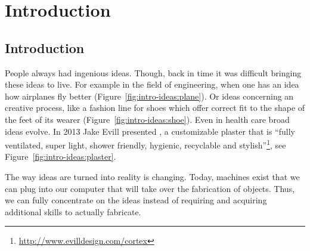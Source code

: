 \documentclass[../ClassicThesis.tex]{subfiles}
\begin{document}
\chapter{Introduction}
\label{ch:introduction}

\section{Introduction}



People always had ingenious ideas. Though, back in time it was
difficult bringing these ideas to live. For example in the field of
engineering, when one has an idea how airplanes fly better
(Figure~\ref{fig:intro-ideas:plane}). Or ideas concerning an creative
process, like a fashion line for shoes which offer correct fit to the
shape of the feet of its wearer (Figure~\ref{fig:intro-ideas:shoe}).
Even in health care broad ideas evolve. In 2013 Jake Evill presented
, a customizable plaster that is \enquote{fully
  ventilated, super light, shower friendly, hygienic, recyclable and
  stylish}\footnote{\url{http://www.evilldesign.com/cortex}}, see
Figure~\ref{fig:intro-ideas:plaster}.

The way ideas are turned into reality is changing. Today, machines
exist that we can plug into our computer that will take over the
fabrication of objects. Thus, we can fully concentrate on the ideas
instead of requiring and acquiring additional skills to actually
fabricate.

\end{document}
